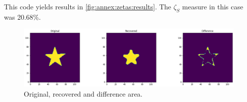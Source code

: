 		This code yields results in \autoref{fig:annex:zetas:results}. The $\zeta_S$ measure in this case was 20.68\%.
		\begin{figure}[!htb]
			\centering
			\includegraphics[width=\textwidth]{./figuras/annex/02_zetas/output_20_0.png}
			\caption{Original, recovered and difference area.}
			\label{fig:annex:zetas:results}
		\end{figure}
